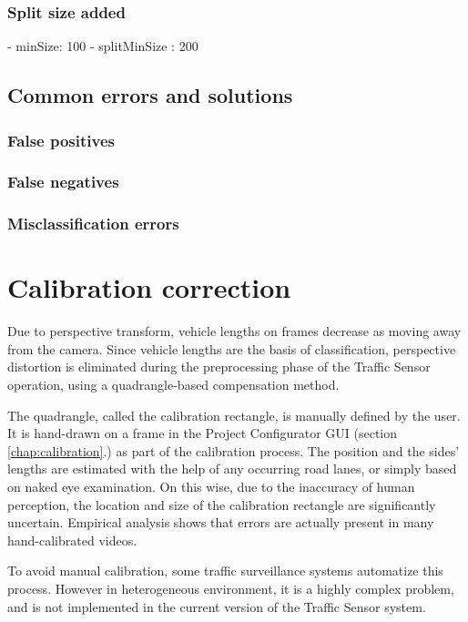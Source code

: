 \subsubsection{Split size added}
- minSize: 100
- splitMinSize : 200

\subsection{Common errors and solutions}
\subsubsection{False positives}
\subsubsection{False negatives}
\subsubsection{Misclassification errors}

\section{Calibration correction}\label{chap:cal_corr}
Due to perspective transform, vehicle lengths on frames decrease as moving away from the camera.
Since vehicle lengths are the basis of classification, perspective distortion is eliminated during the preprocessing phase of the Traffic Sensor operation, using a quadrangle-based compensation method.

The quadrangle, called the calibration rectangle, is manually defined by the user.
It is hand-drawn on a frame in the Project Configurator GUI (section \ref{chap:calibration}.) as part of the calibration process.
The position and the sides' lengths are estimated with the help of any occurring road lanes, or simply based on naked eye examination.
On this wise, due to the inaccuracy of human perception, the location and size of the calibration rectangle are significantly uncertain.
Empirical analysis shows that errors are actually present in many hand-calibrated videos.

To avoid manual calibration, some traffic surveillance systems automatize this process.
However in heterogeneous environment, it is a highly complex problem, and is not implemented in the current version of the Traffic Sensor system.

